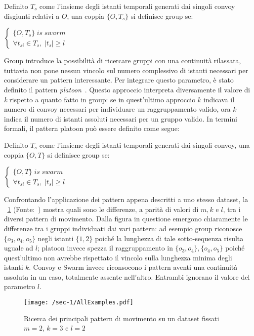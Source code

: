\begin{definition}[Group]\label{definition:group}
  Definito \(T_{s}\) come l'insieme degli istanti temporali generati dai singoli convoy disgiunti relativi a \(O\),
  una coppia \( \{ O, T_{s} \} \) si definisce group se:
  \begin{center}
    \(
      \begin{cases}
         \{ O, T_{s} \} \; is \; swarm   \\
      \forall t_{si} \in T_{s}, \; |t_{s}| \geq l
      \end{cases}
    \)

  \end{center}
\end{definition}

Group introduce la possibilità di ricercare gruppi con una continuità rilassata, tuttavia
non pone nessun vincolo sul numero complessivo di istanti necessari per considerare un pattern interessante.
Per integrare questo parametro, è stato definito il pattern \textit{platoon}~\cite{li2015efficient}.
Questo approccio interpreta diversamente il valore di \textit{k} rispetto a quanto fatto in
group: se in quest'ultimo approccio \(k\) indicava il numero di convoy necessari per individuare
un raggruppamento valido, ora \(k\) indica il numero di istanti assoluti necessari per
un gruppo valido.
In termini formali, il pattern platoon può essere definito come segue:

\begin{definition}[Platoon]\label{definition:platoon}
  Definito \(T_{s}\) come l'insieme degli istanti temporali generati dai singoli convoy,
  una coppia \( \{ O, T \} \) si definisce group se:
  \begin{center}
    \(
      \begin{cases}
         \{ O, T \} \; is \; swarm   \\
      \forall t_{si} \in T_{s}, \; |t_{s}| \geq l
      \end{cases}
    \)

  \end{center}
\end{definition}

Confrontando l'applicazione dei pattern appena descritti a uno stesso dataset, la
~\cref{fig:chap-1:AllExample} (Fonte:~\cite{DBLP:journals/pvldb/FanZWT16}) mostra
quali sono le differenze, a parità di valori di \(m, k \) e \(l\), tra i diversi pattern di movimento.
Dalla figura in questione emergono chiaramente le differenze tra i gruppi individuati dai
vari pattern: ad esempio group riconosce \( \{ o_{3}, o_{4}, o_{5}\} \) negli istanti \( \{ 1, 2 \} \)
poiché la lunghezza di tale sotto-sequenza risulta uguale ad \(l\); platoon invece spezza
il raggruppamento in \( \{ o_{3}, o_{4} \}, \{ o_{4}, o_{5} \} \) poiché quest'ultimo non
avrebbe rispettato il vincolo sulla lunghezza minima degli istanti \(k\).
Convoy e Swarm invece riconsocono i pattern aventi una continuità assoluta in un caso,
totalmente assente nell'altro.
Entrambi ignorano il valore del parametro \(l\).

\begin{figure}
  \centering
  \texttt{[image: /sec-1/AllExamples.pdf]}
  \caption{Ricerca dei principali pattern di movimento su un dataset fissati \(m=2\), \(k=3\) e \(l=2\)}%
  \label{fig:chap-1:AllExample}
\end{figure}
